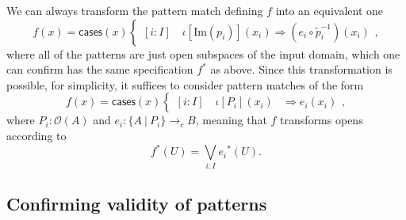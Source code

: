 \documentclass[conference]{IEEEtran}
\newcommand{\cto}{\to_c}
\newcommand{\suchthat}{\ |\ }
\newcommand{\Open}[1]{\mathcal{O}({#1})}
\newcommand{\Img}[1]{\text{Im}\left({#1}\right)}
\newcommand{\oinclf}[1]{\iota[{#1}]}
\newcommand{\oincl}[2]{\oinclf{#1} \left({#2}\right)}
\newcommand{\Branch}{\Rightarrow}
\newcommand{\iimg}[1]{{#1}^*}
\begin{document}
We can always transform the pattern match defining $f$ into an equivalent one
\[
f(x) = \mathsf{cases}(x)
\begin{cases}
[i : I] \quad \oincl{\Img{p_i}}{x_i} \Branch (e_i \circ \tilde{p}_i^{-1})(x_i)
\end{cases},
\]
where all of the patterns are just open subspaces of the input domain, which one can confirm has the same specification $\iimg{f}$ as above. Since this transformation is possible, for simplicity, it suffices to consider pattern matches of the form
\[
f(x) = \mathsf{cases}(x)
\begin{cases}
[i : I] \quad \oincl{P_i}{x_i} &\Branch e_i(x_i)
\end{cases},
\]
where $P_i : \Open{A}$ and $e_i : \{ A \suchthat P_i \} \cto B$, meaning that $f$ transforms opens according to
\[
\iimg{f}(U) = \bigvee_{i : I} \iimg{e_i}(U).
\]

\subsection{Confirming validity of patterns}
\end{document}
